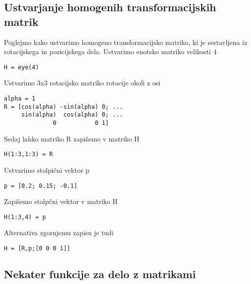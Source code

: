 \subsection{Ustvarjanje homogenih transformacijskih matrik}
Poglejmo kako ustvarimo homogeno transformacijsko matriko, ki je sestavljena iz rotacijskega in pozicijskega dela.
Ustvarimo enotsko matriko velikosti $4$
\vspace{-0.5cm}
\begin{lstlisting}
H = eye(4)
\end{lstlisting}
\vspace{0.2cm}

Ustvarimo 3x3 rotacijsko matriko rotacije okoli z osi
\vspace{-0.5cm}
\begin{lstlisting}
alpha = 1
R = [cos(alpha) -sin(alpha) 0; ...
     sin(alpha)  cos(alpha) 0; ...
              0           0 1]
\end{lstlisting}
\vspace{0.2cm}


Sedaj lahko matriko R zapišemo v matriko H
\vspace{-0.5cm}
\begin{lstlisting}
H(1:3,1:3) = R
\end{lstlisting}
\vspace{0.2cm}


Ustvarimo stolpični vektor p
\vspace{-0.5cm}
\begin{lstlisting}
p = [0.2; 0.15; -0.1]
\end{lstlisting}
\vspace{0.2cm}


Zapišemo stolpčni vektor v matriko H
\vspace{-0.5cm}
\begin{lstlisting}
H(1:3,4) = p
\end{lstlisting}
\vspace{0.2cm}


Alternativa zgornjemu zapisu je tudi
\vspace{-0.5cm}
\begin{lstlisting}
H = [R,p;[0 0 0 1]]
\end{lstlisting}
\vspace{0.2cm}

\subsection{Nekater funkcije za delo z matrikami}

